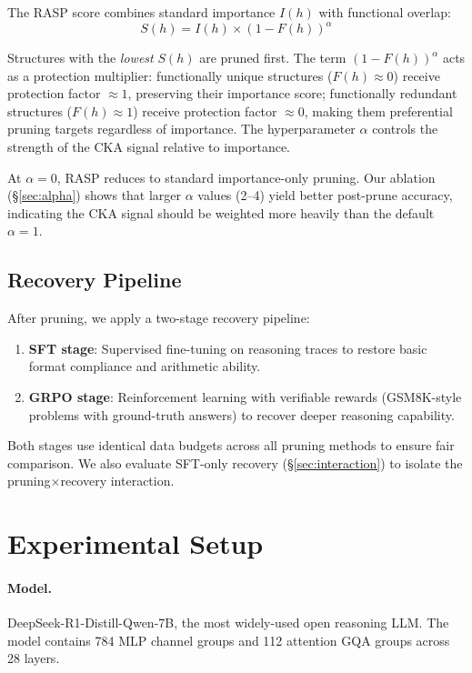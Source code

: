 \documentclass[11pt]{article}
\begin{document}
The RASP score combines standard importance $I(h)$ with functional overlap:
\begin{equation}
S(h) = I(h) \times (1 - F(h))^\alpha
\end{equation}

Structures with the \emph{lowest} $S(h)$ are pruned first. The term $(1 - F(h))^\alpha$ acts as a protection multiplier: functionally unique structures ($F(h) \approx 0$) receive protection factor $\approx 1$, preserving their importance score; functionally redundant structures ($F(h) \approx 1$) receive protection factor $\approx 0$, making them preferential pruning targets regardless of importance. The hyperparameter $\alpha$ controls the strength of the CKA signal relative to importance.

At $\alpha = 0$, RASP reduces to standard importance-only pruning. Our ablation (\S\ref{sec:alpha}) shows that larger $\alpha$ values (2--4) yield better post-prune accuracy, indicating the CKA signal should be weighted more heavily than the default $\alpha=1$.

\subsection{Recovery Pipeline}

After pruning, we apply a two-stage recovery pipeline:
\begin{enumerate}
\item \textbf{SFT stage}: Supervised fine-tuning on reasoning traces to restore basic format compliance and arithmetic ability.
\item \textbf{GRPO stage}: Reinforcement learning with verifiable rewards (GSM8K-style problems with ground-truth answers) to recover deeper reasoning capability.
\end{enumerate}

Both stages use identical data budgets across all pruning methods to ensure fair comparison. We also evaluate SFT-only recovery (\S\ref{sec:interaction}) to isolate the pruning$\times$recovery interaction.

\section{Experimental Setup}
\label{sec:setup}

\paragraph{Model.} DeepSeek-R1-Distill-Qwen-7B, the most widely-used open reasoning LLM. The model contains 784 MLP channel groups and 112 attention GQA groups across 28 layers.
\end{document}
